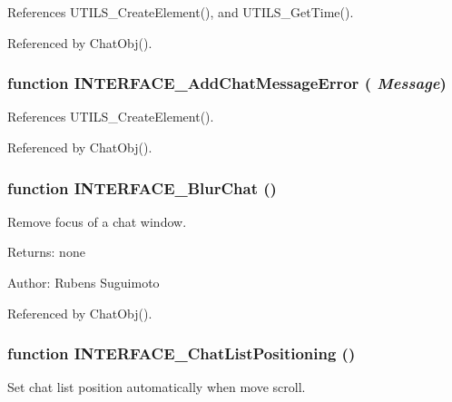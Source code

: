 References UTILS\_\-CreateElement(), and UTILS\_\-GetTime().

Referenced by ChatObj().
\subsubsection[INTERFACE\_\-AddChatMessageError]{\setlength{\rightskip}{0pt plus 5cm}function INTERFACE\_\-AddChatMessageError ( {\em Message})}\label{interface_2chat_8js_27d990f8255316f0806351fc8417411b}




References UTILS\_\-CreateElement().

Referenced by ChatObj().
\subsubsection[INTERFACE\_\-BlurChat]{\setlength{\rightskip}{0pt plus 5cm}function INTERFACE\_\-BlurChat ()}\label{interface_2chat_8js_3f8501c612436ba1fd48874bf8e9c612}


Remove focus of a chat window. 

\begin{Desc}
\item[Returns:]none \end{Desc}
\begin{Desc}
\item[Author:]Rubens Suguimoto \end{Desc}


Referenced by ChatObj().
\subsubsection[INTERFACE\_\-ChatListPositioning]{\setlength{\rightskip}{0pt plus 5cm}function INTERFACE\_\-ChatListPositioning ()}\label{interface_2chat_8js_8600a0a0ad2bb77b2d940b7c28df89b1}


Set chat list position automatically when move scroll. 

